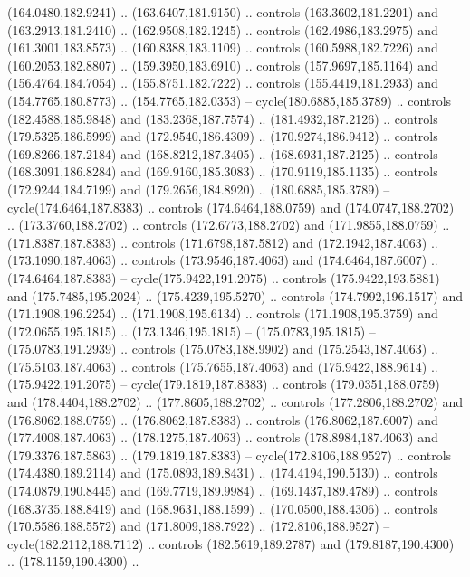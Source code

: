 \begin{scope}[cm={{1.25,0.0,0.0,-1.25,(0.0,442.91375)}}]
    (164.0480,182.9241) .. (163.6407,181.9150) .. controls (163.3602,181.2201) and
    (163.2913,181.2410) .. (162.9508,182.1245) .. controls (162.4986,183.2975) and
    (161.3001,183.8573) .. (160.8388,183.1109) .. controls (160.5988,182.7226) and
    (160.2053,182.8807) .. (159.3950,183.6910) .. controls (157.9697,185.1164) and
    (156.4764,184.7054) .. (155.8751,182.7222) .. controls (155.4419,181.2933) and
    (154.7765,180.8773) .. (154.7765,182.0353) -- cycle(180.6885,185.3789) ..
    controls (182.4588,185.9848) and (183.2368,187.7574) .. (181.4932,187.2126) ..
    controls (179.5325,186.5999) and (172.9540,186.4309) .. (170.9274,186.9412) ..
    controls (169.8266,187.2184) and (168.8212,187.3405) .. (168.6931,187.2125) ..
    controls (168.3091,186.8284) and (169.9160,185.3083) .. (170.9119,185.1135) ..
    controls (172.9244,184.7199) and (179.2656,184.8920) .. (180.6885,185.3789) --
    cycle(174.6464,187.8383) .. controls (174.6464,188.0759) and
    (174.0747,188.2702) .. (173.3760,188.2702) .. controls (172.6773,188.2702) and
    (171.9855,188.0759) .. (171.8387,187.8383) .. controls (171.6798,187.5812) and
    (172.1942,187.4063) .. (173.1090,187.4063) .. controls (173.9546,187.4063) and
    (174.6464,187.6007) .. (174.6464,187.8383) -- cycle(175.9422,191.2075) ..
    controls (175.9422,193.5881) and (175.7485,195.2024) .. (175.4239,195.5270) ..
    controls (174.7992,196.1517) and (171.1908,196.2254) .. (171.1908,195.6134) ..
    controls (171.1908,195.3759) and (172.0655,195.1815) .. (173.1346,195.1815) --
    (175.0783,195.1815) -- (175.0783,191.2939) .. controls (175.0783,188.9902) and
    (175.2543,187.4063) .. (175.5103,187.4063) .. controls (175.7655,187.4063) and
    (175.9422,188.9614) .. (175.9422,191.2075) -- cycle(179.1819,187.8383) ..
    controls (179.0351,188.0759) and (178.4404,188.2702) .. (177.8605,188.2702) ..
    controls (177.2806,188.2702) and (176.8062,188.0759) .. (176.8062,187.8383) ..
    controls (176.8062,187.6007) and (177.4008,187.4063) .. (178.1275,187.4063) ..
    controls (178.8984,187.4063) and (179.3376,187.5863) .. (179.1819,187.8383) --
    cycle(172.8106,188.9527) .. controls (174.4380,189.2114) and
    (175.0893,189.8431) .. (174.4194,190.5130) .. controls (174.0879,190.8445) and
    (169.7719,189.9984) .. (169.1437,189.4789) .. controls (168.3735,188.8419) and
    (168.9631,188.1599) .. (170.0500,188.4306) .. controls (170.5586,188.5572) and
    (171.8009,188.7922) .. (172.8106,188.9527) -- cycle(182.2112,188.7112) ..
    controls (182.5619,189.2787) and (179.8187,190.4300) .. (178.1159,190.4300) ..

\end{scope}

